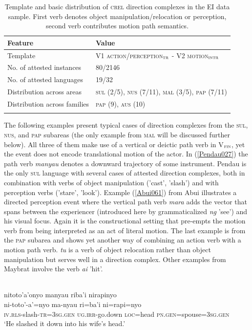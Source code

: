 \begin{table}
\begin{tabular}{ll}
\lsptoprule
Feature&Value\tabularnewline
\midrule
Template&V1 \textsc{action/perception$_{\textsc{tr}}$} - V2 \textsc{motion$_\textsc{intr}$}\tabularnewline
No. of attested instances& 80/2146 \tabularnewline
No. of attested languages& 19/32 \tabularnewline
Distribution across areas& \textsc{sul} (2/5), \textsc{nus} (7/11), \textsc{mal} (3/5), \textsc{pap} (7/11) \tabularnewline
Distribution across families& \textsc{pap} (9), \textsc{aus} (10) \tabularnewline
\lspbottomrule
\end{tabular}
\caption[Template and basic distribution of \textsc{crel} direction complexes]{Template and basic distribution of \textsc{crel} direction complexes in the EI data sample. First verb denotes object manipulation/relocation or perception, second verb contributes motion path semantics.}
\label{table:basiccreldir}
\end{table}


The following examples present typical cases of direction complexes from the \textsc{sul}, \textsc{nus}, and \textsc{pap} subareas (the only example from \textsc{mal} will be discussed further below). All three of them make use of a vertical or deictic path verb in V$_{\textsc{fin}}$, yet the event does not encode translational motion of the actor. In (\ref{Pendau027}) the path verb \textit{manyau} denotes a downward trajectory of some instrument. Pendau is the only \textsc{sul} language with several cases of attested direction complexes, both in combination with verbs of object manipulation ('cast', 'slash') and with perception verbs ('stare', 'look'). Example (\ref{Abui061}) from Abui illustrates a directed perception event where the vertical path verb \textit{mara} adds the vector that spans between the experiencer (introduced here by grammaticalized \textit{ng} 'see') and his visual focus. Again it is the constructional setting that pre-empts the motion verb from being interpreted as an act of literal motion. The last example is from the \textsc{pap} subarea and shows yet another way of combining an action verb with a motion path verb. \textit{tu} is a verb of object relocation rather than object manipulation but serves well in a direction complex. Other examples from Maybrat involve the verb \textit{ai} 'hit'.

\ea \label{Pendau027}
\\
\glll nitoto'a'onyo manyau riba'i nirapinyo \\
ni-toto'-a'=nyo ma-nyau ri=ba'i ni=rapi=nyo \\
\textsc{iv}.\textsc{rls}-slash-\textsc{tr}=\textsc{3}\textsc{sg}.\textsc{gen} \textsc{ug}.\textsc{irr}-go.down \textsc{loc}=head \textsc{pn}.\textsc{gen}=spouse=\textsc{3}\textsc{sg}.\textsc{gen} \\
\glft `He slashed it down into his wife's head.' \\ 
\z

